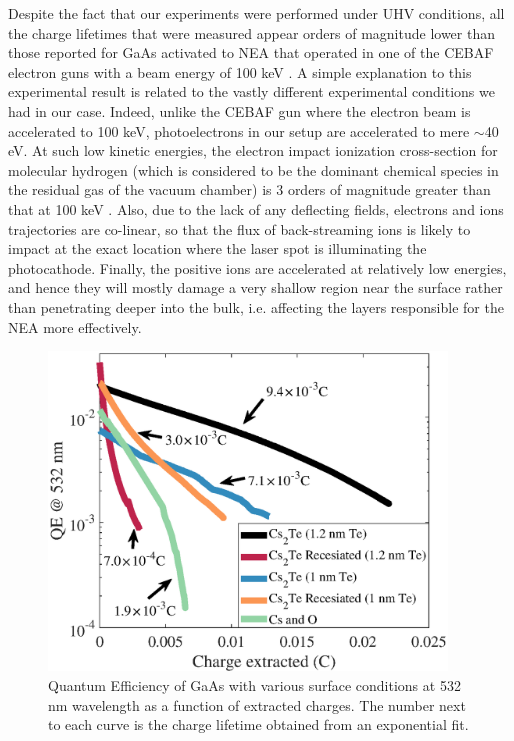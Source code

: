 Despite the fact that our experiments were performed under UHV conditions, all the charge lifetimes that were measured appear orders of magnitude lower than those reported for GaAs activated to NEA that operated in one of the CEBAF electron guns with a beam energy of 100 keV \cite{sinclair2007_DevelopmentHighAverage}. A simple explanation to this experimental result is related to the vastly different experimental conditions we had in our case. Indeed, unlike the CEBAF gun where the electron beam is accelerated to 100 keV, photoelectrons in our setup are accelerated to mere $\sim$40 eV. At such low kinetic energies, the electron impact ionization cross-section for molecular hydrogen (which is considered to be the dominant chemical species in the residual gas of the vacuum chamber) is 3 orders of magnitude greater than that at 100 keV \cite{grames2011_ChargeFluenceLifetime,sinclair2007_DevelopmentHighAverage}. Also, due to the lack of any deflecting fields, electrons and ions trajectories are co-linear, so that the flux of back-streaming ions is likely to impact at the exact location where the laser spot is illuminating the photocathode. Finally, the positive ions are accelerated at relatively low energies, and hence they will mostly damage a very shallow region near the surface rather than penetrating deeper into the bulk, i.e. affecting the layers responsible for the NEA more effectively.
\begin{figure}
    \centering
    \includegraphics[width=300pt]{figs/CsTe/lifetime.eps}
    \caption{Quantum Efficiency of GaAs with various surface conditions at 532 nm wavelength as a function of extracted charges. The number next to each curve is the charge lifetime obtained from an exponential fit.
    }
    \label{lifetime}
\end{figure}

